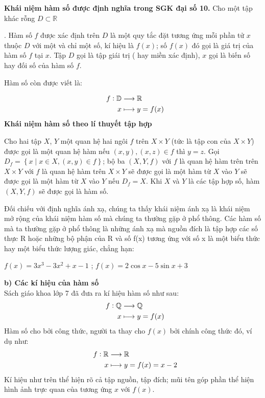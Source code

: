 \documentclass[12pt,oneside,a4paper,reqno]{book}
\begin{document}
{\bf Khái niệm hàm số được định nghĩa trong SGK đại số 10.}
Cho một tập khác rỗng $D \subset \mathbb{R}$

. Hàm số $f$ được xác định trên $D$ là một quy tắc đặt tương ứng mỗi phần tử $x$ thuộc $D$ với một và chỉ một số, kí hiệu là $f(x)$; số $f(x)$ đó  gọi là giá trị của hàm số $f$ tại $x$. Tập $D$ gọi là tập giái trị ( hay miền xác định), $x$ gọi là biến số hay đối số của hàm số $f$.

Hàm số còn được viết là: 

\begin{align*}
\text{ \space}f:\mathbb{D}&\longrightarrow\mathbb{R}\\
x&\longmapsto y=f(x)
\end{align*}
{\bf Khái niệm hàm số theo lí thuyết tập hợp}

Cho hai tập $X$, $Y$ một quan hệ hai ngôi $f$ trên $X \times Y$ (tức là tập con của $X \times Y$) được gọi là một quan hệ hàm nếu $(x,y), (x,z) \in f$ thì $y=z$. Gọi $D_{f}=\left\{x\mid x \in X, (x,y) \in f\right\}$; bộ ba $(X,Y,f)$ với $f$ là quan hệ hàm trên trên $X \times Y$ với $f$ là quan hệ hàm trên $X \times Y$ sẽ được gọi là một hàm từ $X$ vào $Y$ sẽ được gọi là một hàm từ $X$ vào $Y$ nếu $D_{f}=X$. Khi $X$ và $Y$ là các tập hợp số, hàm $(X,Y,f)$ sẽ được gọi là hàm số.

       Đối chiếu với định nghĩa ánh xạ, chúng ta thấy khái niệm ánh xạ là khái niệm mở rộng của khái niệm hàm số mà chúng ta thường gặp ở phổ thông. Các hàm số mà ta thường gặp ở phổ thông là những ánh xạ mà nguồn đích là tập hợp các số thực R hoặc những bộ phận của R và số f(x) tương ứng với số x là một biểu thức hay một biểu thức lượng giác, chẳng hạn:
       
   $f(x)=3x^3-3x^2+x-1$ ; $f(x)=2\cos x-5\sin x+3$
   
{\bf b)  Các kí hiệu của hàm số}\\
Sách giáo khoa lớp 7 đã đưa ra kí hiệu hàm số như sau:\\
\begin{align*}
\text{ \space}f:\mathbb{Q}&\longrightarrow\mathbb{Q}\\
x&\longmapsto y=f(x)
\end{align*}
\medskip
 Hàm số cho bởi công thức, người ta thay cho $f(x)$ bởi chính công thức đó, ví dụ như:
\begin{align*}
\text{ \space}f:\mathbb{R}&\longrightarrow\mathbb{R}\\
x&\longmapsto y=f(x)=x-2
\end{align*}
    Kí hiệu như trên thể hiện rõ cả tập nguồn, tập đích; mũi tên góp phần thể hiện hình ảnh trực quan của tương ứng $x$ với $f(x)$.
    
\end{document}
